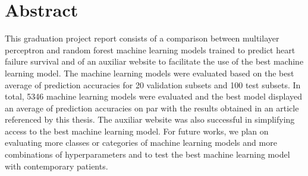 \chapter*{Abstract}

This graduation project report consists of a comparison between multilayer perceptron and random forest machine learning models trained to predict heart failure survival and of an auxiliar website to facilitate the use of the best machine learning model. The machine learning models were evaluated based on the best average of prediction accuracies for 20 validation subsets and 100 test subsets. In total, 5346 machine learning models were evaluated and the best model displayed an average of prediction accuracies on par with the results obtained in an article referenced by this thesis. The auxiliar website was also successful in simplifying access to the best machine learning model. For future works, we plan on evaluating more classes or categories of machine learning models and more combinations of hyperparameters and to test the best machine learning model with contemporary patients.
